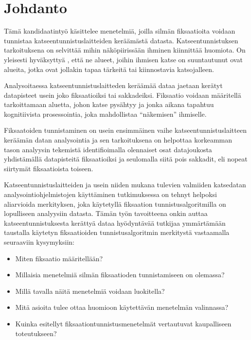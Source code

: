\section{Johdanto}

Tämä kandidaatintyö käsittelee menetelmiä, joilla silmän fiksaatioita
voidaan tunnistaa katseentunnistuslaitteiden keräämästä datasta. Katseentunnistuksen tarkoituksena on selvittää mihin näköpiirissään ihminen kiinnittää huomiota. On yleisesti hyväksyttyä \citep[s.33]{munn2008}, että ne alueet, joihin ihmisen katse on suuntautunut ovat alueita, jotka ovat jollakin tapaa tärkeitä tai kiinnostavia katsojalleen. 

Analysoitaessa katseentunnistuslaitteden keräämää dataa jaetaan kerätyt datapisteet usein joko fiksaatioiksi tai sakkadeiksi. \citep[s. 71]{salvucci2000} Fiksaatio voidaan määritellä tarkoittamaan aluetta, johon katse pysähtyy \citep[s. 71]{salvucci2000} ja jonka aikana tapahtuu kognitiivista prosessointia, joka mahdollistaa ``näkemisen''  ihmiselle. \citep[s. 881]{Blignaut2009}

Fiksaatoiden tunnistaminen on usein ensimmäinen vaihe katseentunnistuslaitteen keräämän datan analysointia ja sen tarkoituksena on helpottaa korkeamman tason analyysin tekemistä identifioimalla olennaiset osat datajoukosta yhdistämällä datapisteitä fiksaatioiksi ja seulomalla siitä pois sakkadit, eli nopeat siirtymät fiksaatioista toiseen. \citep[s. 18]{mould2012}

Katseentunnistuslaitteiden ja usein niiden mukana tulevien valmiiden katsedatan analysointiohjelmistojen käyttäminen tutkimuksessa on tehnyt helpoksi aliarvioida merkityksen, joka käytetyllä fiksaation tunnistusalgoritmilla on lopulliseen analyysiin datasta. \citep[s. 111]{shic2008}
Tämän työn tavoitteena onkin auttaa katseentunnistuksesta kerättyä dataa hyödyntävää tutkijaa ymmärtämään taustalla käytetyn fiksaatioiden tunnistusalgoritmin merkitystä vastaamalla seuraaviin kysymyksiin:
\begin{itemize}
	\item Miten fiksaatio määritellään?
	\item Millaisia menetelmiä silmän fiksaatioden tunnistamiseen on olemassa?
	\item Millä tavalla näitä menetelmiä voidaan luokitella?
	\item Mitä asioita tulee ottaa huomioon käytettävän menetelmän valinnassa?
	\item Kuinka esitellyt fiksaationtunnistusmenetelmät vertautuvat kaupalliseen toteutukseen?
\end{itemize}

